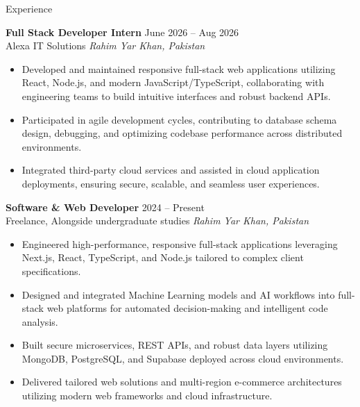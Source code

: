 \documentclass{resume} %
\begin{document}
\begin{rSection}{Experience}

\textbf{Full Stack Developer Intern} \hfill June 2026 -- Aug 2026\\
Alexa IT Solutions \hfill \textit{Rahim Yar Khan, Pakistan}
 \begin{itemize}
    \itemsep -3pt {} 
     \item Developed and maintained responsive full-stack web applications utilizing React, Node.js, and modern JavaScript/TypeScript, collaborating with engineering teams to build intuitive interfaces and robust backend APIs.
     \item Participated in agile development cycles, contributing to database schema design, debugging, and optimizing codebase performance across distributed environments.
     \item Integrated third-party cloud services and assisted in cloud application deployments, ensuring secure, scalable, and seamless user experiences.
 \end{itemize}

\textbf{Software \& Web Developer} \hfill 2024 -- Present\\
Freelance, Alongside undergraduate studies \hfill \textit{Rahim Yar Khan, Pakistan}
 \begin{itemize}
    \itemsep -3pt {} 
     \item Engineered high-performance, responsive full-stack applications leveraging Next.js, React, TypeScript, and Node.js tailored to complex client specifications.
     \item Designed and integrated Machine Learning models and AI workflows into full-stack web platforms for automated decision-making and intelligent code analysis.
     \item Built secure microservices, REST APIs, and robust data layers utilizing MongoDB, PostgreSQL, and Supabase deployed across cloud environments.
     \item Delivered tailored web solutions and multi-region e-commerce architectures utilizing modern web frameworks and cloud infrastructure.
 \end{itemize}

\end{rSection}


\end{document}
